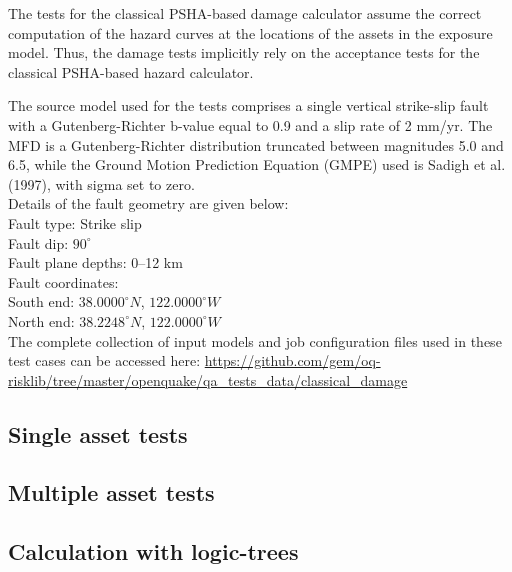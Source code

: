 The tests for the classical PSHA-based damage calculator assume the correct computation of the hazard curves at the locations of the assets in the exposure model. Thus, the damage tests implicitly rely on the acceptance tests for the classical PSHA-based hazard calculator.

The source model used for the tests comprises a single vertical strike-slip fault with a Gutenberg-Richter b-value equal to 0.9 and a slip rate of 2 mm/yr. The MFD is a Gutenberg-Richter distribution truncated between magnitudes 5.0 and 6.5, while the Ground Motion Prediction Equation (GMPE) used is Sadigh et al. (1997), with sigma set to zero.\\

\noindent Details of the fault geometry are given below:\\

\noindent
Fault type: Strike slip\\
Fault dip: $90^{\circ}$\\
Fault plane depths: 0--12 km\\
Fault coordinates:\\
South end: $38.0000^{\circ} N$, $122.0000^{\circ} W$\\
North end: $38.2248^{\circ} N$, $122.0000^{\circ} W$\\

The complete collection of input models and job configuration files used in these test cases can be accessed here:
\href{https://github.com/gem/oq-risklib/tree/master/openquake/qa_tests_data/classical_damage}
{https://github.com/gem/oq-risklib/tree/master/openquake/qa\_tests\_data/classical\_damage}

\subsection{Single asset tests}
\label{subsec:classical-damage-single}


\subsection{Multiple asset tests}
\label{subsec:classical-damage-multiple}


\subsection{Calculation with logic-trees}
\label{subsec:classical-damage-logictrees}

